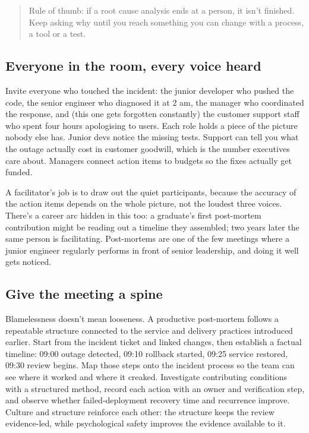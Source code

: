 \begin{quote}\small
Rule of thumb: if a root cause analysis ends at a person, it isn't finished. Keep asking why until you reach something you can change with a process, a tool or a test.
\end{quote}



\subsection{Everyone in the room, every voice heard}


Invite everyone who touched the incident: the junior developer who pushed the code, the senior engineer who diagnosed it at 2 am, the manager who coordinated the response, and (this one gets forgotten constantly) the customer support staff who spent four hours apologising to users. Each role holds a piece of the picture nobody else has. Junior devs notice the missing tests. Support can tell you what the outage actually cost in customer goodwill, which is the number executives care about. Managers connect action items to budgets so the fixes actually get funded.


A facilitator's job is to draw out the quiet participants, because the accuracy of the action items depends on the whole picture, not the loudest three voices. There's a career arc hidden in this too: a graduate's first post-mortem contribution might be reading out a timeline they assembled; two years later the same person is facilitating. Post-mortems are one of the few meetings where a junior engineer regularly performs in front of senior leadership, and doing it well gets noticed.



\subsection{Give the meeting a spine}


Blamelessness doesn't mean looseness. A productive post-mortem follows a repeatable structure connected to the service and delivery practices introduced earlier. Start from the incident ticket and linked changes, then establish a factual timeline: 09:00 outage detected, 09:10 rollback started, 09:25 service restored, 09:30 review begins. Map those steps onto the incident process so the team can see where it worked and where it creaked. Investigate contributing conditions with a structured method, record each action with an owner and verification step, and observe whether failed-deployment recovery time and recurrence improve. Culture and structure reinforce each other: the structure keeps the review evidence-led, while psychological safety improves the evidence available to it. \autocite{google-postmortem,dora-metrics}



